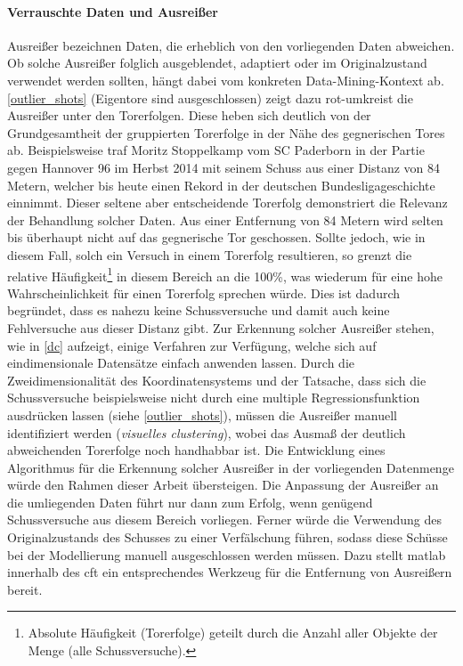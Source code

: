 \paragraph{Verrauschte Daten und Ausreißer}
Ausreißer bezeichnen Daten, die erheblich von den vorliegenden Daten abweichen. Ob solche Ausreißer folglich ausgeblendet, adaptiert oder im Originalzustand verwendet werden sollten, hängt dabei vom konkreten Data-Mining-Kontext ab. \vref{outlier_shots} (Eigentore sind ausgeschlossen) zeigt dazu rot-umkreist die Ausreißer unter den Torerfolgen. Diese 	 heben sich deutlich von der Grundgesamtheit der gruppierten Torerfolge in der Nähe des gegnerischen Tores ab. Beispielsweise traf Moritz Stoppelkamp vom SC Paderborn in der Partie gegen Hannover 96 im Herbst 2014 mit seinem Schuss aus einer Distanz von 84 Metern, welcher bis heute einen Rekord in der deutschen Bundesligageschichte einnimmt. Dieser seltene aber entscheidende Torerfolg demonstriert die Relevanz der Behandlung solcher Daten. Aus einer Entfernung von 84 Metern wird selten bis überhaupt nicht auf das gegnerische Tor geschossen. Sollte jedoch, wie in diesem Fall, solch ein Versuch in einem Torerfolg resultieren, so grenzt die relative Häufigkeit\footnote{Absolute Häufigkeit (Torerfolge) geteilt durch die Anzahl aller Objekte der Menge (alle Schussversuche).} in diesem Bereich an die 100\%, was wiederum für eine hohe Wahrscheinlichkeit für einen Torerfolg sprechen würde. Dies ist dadurch begründet, dass es nahezu keine Schussversuche und damit auch keine Fehlversuche aus dieser Distanz gibt. Zur Erkennung solcher Ausreißer stehen, wie in \vref{dc} aufzeigt, einige Verfahren zur Verfügung, welche sich auf eindimensionale Datensätze einfach anwenden lassen. Durch die Zweidimensionalität des Koordinatensystems und der Tatsache, dass sich die Schussversuche beispielsweise nicht durch eine multiple Regressionsfunktion ausdrücken lassen (siehe \vref{outlier_shots}), müssen die Ausreißer manuell identifiziert werden (\textit{visuelles \gls{clustering}}), wobei das Ausmaß der deutlich abweichenden Torerfolge noch handhabbar ist. Die Entwicklung eines Algorithmus für die Erkennung solcher Ausreißer in der vorliegenden Datenmenge würde den Rahmen dieser Arbeit übersteigen. Die Anpassung der Ausreißer an die umliegenden Daten führt nur dann zum Erfolg, wenn genügend Schussversuche aus diesem Bereich vorliegen. Ferner würde die Verwendung des Originalzustands des Schusses zu einer Verfälschung führen, sodass diese Schüsse bei der Modellierung manuell ausgeschlossen werden müssen. Dazu stellt \gls{matlab} innerhalb des \gls{cft} ein entsprechendes Werkzeug für die Entfernung von Ausreißern bereit.

